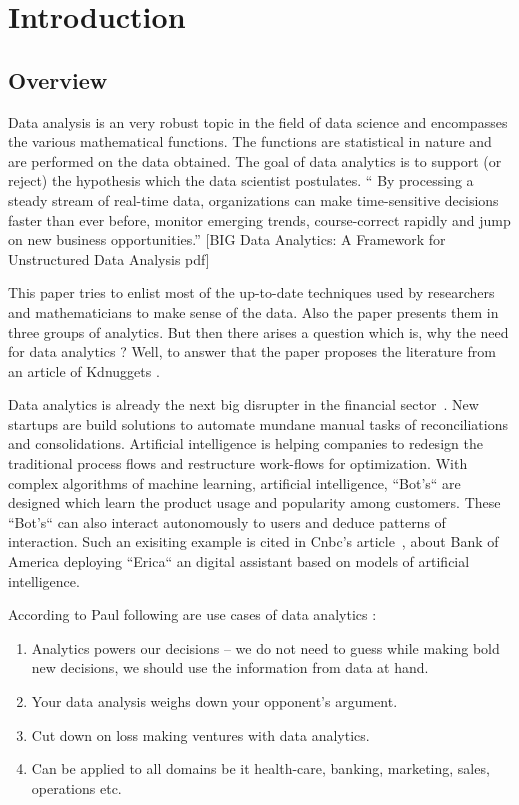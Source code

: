 \setlength{\footskip}{8mm}

\chapter{Introduction}

\section{Overview}

Data analysis is an very robust topic in the field of data science and encompasses the various mathematical functions. The functions are statistical in nature and are performed on the data obtained. The goal of data analytics is to support (or reject) the hypothesis which the data scientist postulates.
“ By processing a steady stream of real-time data, organizations can make time-sensitive decisions faster than ever before, monitor emerging trends, course-correct rapidly and jump on new business opportunities.” [BIG Data Analytics: A Framework for Unstructured Data Analysis pdf]

This paper tries to enlist most of the up-to-date techniques used by researchers and mathematicians to make sense of the data. Also the paper presents them in three groups of analytics.
But then there arises a question which is, why the need for data analytics ? Well, to answer that the paper proposes the literature from an article of Kdnuggets .

Data analytics is already the next big disrupter in the financial sector~. New startups are build solutions to automate mundane manual tasks of reconciliations and consolidations. Artificial intelligence is helping companies to redesign the traditional process flows and restructure work-flows for optimization. With complex algorithms of machine learning, artificial intelligence, ``Bot's`` are designed which learn the product usage and popularity among customers. These ``Bot's`` can also interact autonomously to users and deduce patterns of interaction.
Such an exisiting example is cited in Cnbc's article~, about Bank of America deploying ``Erica`` an digital assistant based on models of artificial intelligence.

According to Paul following are use cases  of data analytics :
\begin{enumerate}
	\item Analytics powers our decisions – we do not need to guess while making bold new decisions, we should use the information from data at hand.
	\item Your data analysis weighs down your opponent's argument.
	\item Cut down on loss making ventures with data analytics.
	\item Can be applied to all domains be it health-care, banking, marketing, sales, operations etc.
\end{enumerate}

